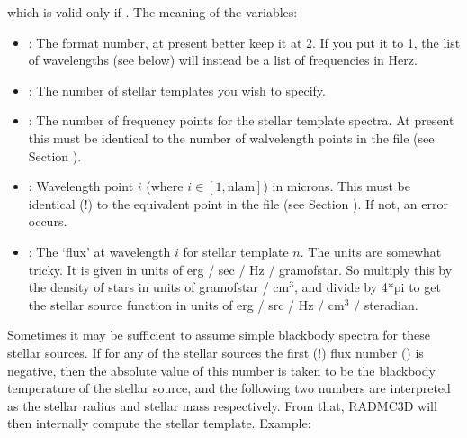\documentclass[letterpaper,10pt,english]{sphinxmanual}
\begin{document}
which is valid only if . The meaning of the variables:
\begin{itemize}
\item {} 
: The format number, at present better keep it at 2.
If you put it to 1, the list of wavelengths (see below) will instead be
a list of frequencies in Herz.

\item {} 
: The number of stellar templates you wish to specify.

\item {} 
: The number of frequency points for the stellar
template spectra. At present this must be identical to the number of
walvelength points in the file  (see
Section {\hyperref[\detokenize{inputoutputfiles:sec-wavelengths}]{}}).

\item {} 
: Wavelength point \(i\) (where \(i\in [1,\mathrm{nlam}]\))
in microns. This must be identical (!) to the
equivalent point in the file  (see
Section {\hyperref[\detokenize{inputoutputfiles:sec-wavelengths}]{}}). If not, an error occurs.

\item {} 
: The ‘flux’ at wavelength \(i\) for
stellar template \(n\). The units are somewhat tricky. It is given in units
of erg / sec / Hz / gram\sphinxhyphen{}of\sphinxhyphen{}star. So multiply this by the density of
stars in units of gram\sphinxhyphen{}of\sphinxhyphen{}star / \(\mathrm{cm}^3\), and divide by 4*pi to get the
stellar source function in units of erg / src / Hz / \(\mathrm{cm}^3\) / steradian.

\end{itemize}

Sometimes it may be sufficient to assume simple blackbody spectra
for these stellar sources. If for any of the stellar sources the first (!)
flux number () is negative, then the absolute
value of this number is taken to be the blackbody temperature of the stellar
source, and the following two numbers are interpreted as the stellar radius
and stellar mass respectively. From that, RADMC\sphinxhyphen{}3D will then internally
compute the stellar template. Example:
\end{document}
